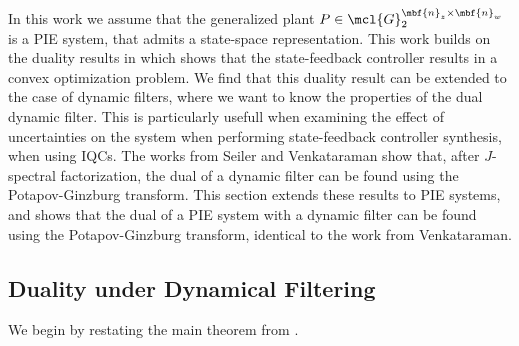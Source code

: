 In this work we assume that the generalized plant $P\in\mcl{G}_2^{\mbf{n}_z\times\mbf{n}_w}$ is a PIE system, that admits a state-space representation.
This work builds on the duality results in \cite{shivaknew} which shows that the state-feedback controller results in a convex optimization problem.
We find that this duality result can be extended to the case of dynamic filters, where we want to know the properties of the dual dynamic filter. This is particularly
usefull when examining the effect of uncertainties on the system when performing state-feedback controller synthesis, when using IQCs. The works from
Seiler and Venkataraman \cite{6915700,venkataraman} show that, after $J$-spectral factorization, the dual of a dynamic filter can be found using the Potapov-Ginzburg transform.
This section extends these results to PIE systems, and shows that the dual of a PIE system with a dynamic filter can be found
using the Potapov-Ginzburg transform, identical to the work from Venkataraman. 

\subsection{Duality under Dynamical Filtering}
We begin by restating the main theorem from \cite{shivaknew}.



